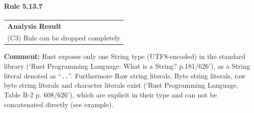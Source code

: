 \paragraph{Rule 5.13.7}
\begin{longtable}{p{13cm}}
\textbf{Analysis Result} \\
(C3) Rule can be dropped completely \\
\end{longtable}
\textbf{Comment:} Rust exposes only one String type (UTF8-encoded) in the standard library (`Rust Programming Language: What is a String? p.181/626'), as a String literal denoted as ``\texttt{..}''. Furthermore Raw string literals, Byte string literals, raw byte string literals and character literals exist (`Rust Programming Language, Table B-2 p. 608/626'), which are explicit in their type and can not be concatenated directly (see example). \\


